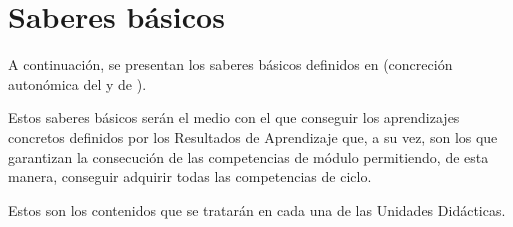 \section{Saberes básicos}

A continuación, se presentan los  saberes básicos definidos en  (concreción autonómica del  y de ).

Estos saberes básicos serán el medio con el que conseguir los aprendizajes concretos definidos por los Resultados de Aprendizaje que, a su vez, son los que garantizan la consecución de las competencias de módulo permitiendo, de esta manera, conseguir adquirir todas las competencias de ciclo.

Estos son los contenidos que se tratarán en cada una de las Unidades Didácticas.

